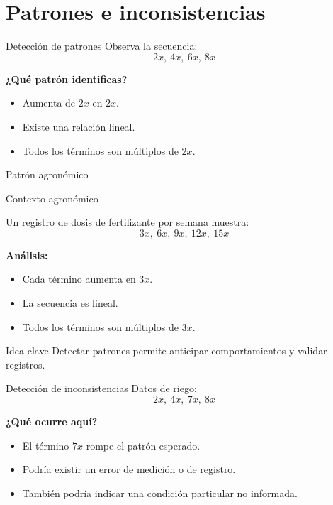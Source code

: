 \documentclass[aspectratio=169,12pt]{beamer}
\newcommand{\IdeaClave}[1]{
	\begin{alertblock}{Idea clave}
		#1
	\end{alertblock}
}
\newcommand{\Agronomia}[1]{
	\begin{exampleblock}{Contexto agronómico}
		#1
	\end{exampleblock}
}
\begin{document}
	\section{Patrones e inconsistencias}
	\begin{frame}{Detección de patrones}
		Observa la secuencia:
		\[
		2x,\ 4x,\ 6x,\ 8x
		\]
		
		\pause
		\textbf{¿Qué patrón identificas?}
		\begin{itemize}
			\item Aumenta de \(2x\) en \(2x\).
			\pause
			\item Existe una relación lineal.
			\pause
			\item Todos los términos son múltiplos de \(2x\).
		\end{itemize}
	\end{frame}
	
	\begin{frame}{Patrón agronómico}
		\Agronomia{
			Un registro de dosis de fertilizante por semana muestra:
			\[
			3x,\ 6x,\ 9x,\ 12x,\ 15x
			\]
		}
		
		\pause
		\textbf{Análisis:}
		\begin{itemize}
			\item Cada término aumenta en \(3x\).
			\pause
			\item La secuencia es lineal.
			\pause
			\item Todos los términos son múltiplos de \(3x\).
		\end{itemize}
		
		\pause
		\IdeaClave{Detectar patrones permite anticipar comportamientos y validar registros.}
	\end{frame}
	
	\begin{frame}{Detección de inconsistencias}
		Datos de riego:
		\[
		2x,\ 4x,\ 7x,\ 8x
		\]
		
		\pause
		\textbf{¿Qué ocurre aquí?}
		\begin{itemize}
			\item El término \(7x\) rompe el patrón esperado.
			\pause
			\item Podría existir un error de medición o de registro.
			\pause
			\item También podría indicar una condición particular no informada.
		\end{itemize}
	\end{frame}
	
\end{document}
